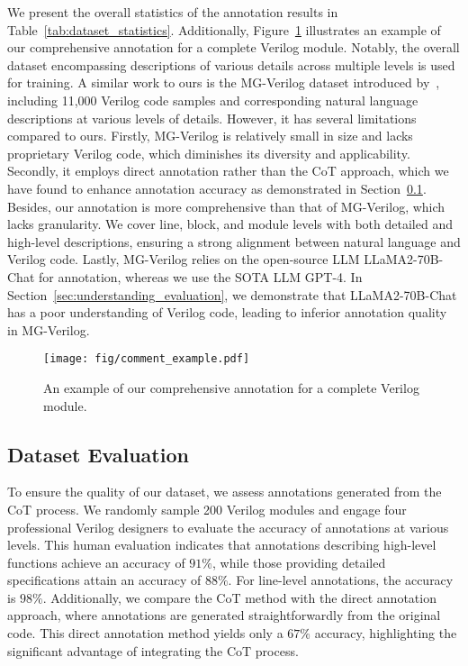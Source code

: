 We present the overall statistics of the annotation results in Table~\ref{tab:dataset_statistics}. 
Additionally, Figure~\ref{fig:comment_example} illustrates an example of our comprehensive annotation for a complete Verilog module. 
Notably, the overall dataset encompassing descriptions of various details across multiple levels is used for training.
A similar work to ours is the MG-Verilog dataset introduced by~\citet{zhang2024mg}, including 11,000 Verilog code samples and corresponding natural language descriptions at various levels of details.
However, it has several limitations compared to ours. Firstly, MG-Verilog is relatively small in size and lacks proprietary Verilog code, which diminishes its diversity and applicability. Secondly, it employs direct annotation rather than the CoT approach, which we have found to enhance annotation accuracy as demonstrated in Section~\ref{sec:dataset_evaluation}. 
Besides, our annotation is more comprehensive than that of MG-Verilog, which lacks granularity. We cover line, block, and module levels with both detailed and high-level descriptions, ensuring a strong alignment between natural language and Verilog code.
Lastly, MG-Verilog relies on the open-source LLM LLaMA2-70B-Chat for annotation, whereas we use the SOTA LLM GPT-4. In Section~\ref{sec:understanding_evaluation}, we demonstrate that LLaMA2-70B-Chat has a poor understanding of Verilog code, leading to inferior annotation quality in MG-Verilog.
\vspace{-10pt}



\begin{figure}[ht]
    \centering
    \texttt{[image: fig/comment\_example.pdf]}
    \vspace{-12pt}
    \caption{An example of our comprehensive annotation for a complete Verilog module.}
    \label{fig:comment_example}
\end{figure}

\vspace{-10pt}
\subsection{Dataset Evaluation}
\label{sec:dataset_evaluation}
To ensure the quality of our dataset, we assess annotations generated from the CoT process. We randomly sample 200 Verilog modules and engage four professional Verilog designers to evaluate the accuracy of annotations at various levels. This human evaluation indicates that annotations describing high-level functions achieve an accuracy of $91\%$, while those providing detailed specifications attain an accuracy of $88\%$. For line-level annotations, the accuracy is $98\%$. Additionally, we compare the CoT method with the direct annotation approach, where annotations are generated straightforwardly from the original code. This direct annotation method yields only a $67\%$ accuracy, highlighting the significant advantage of integrating the CoT process.

